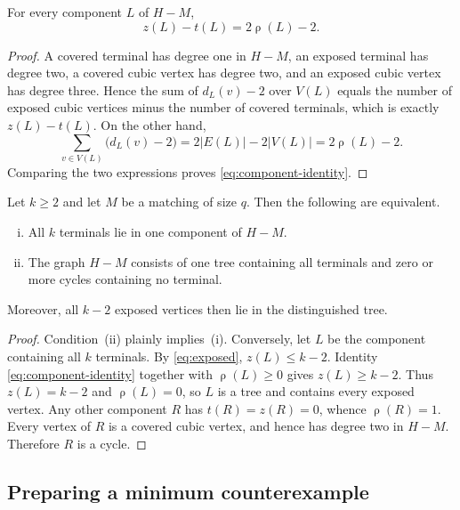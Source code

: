 \documentclass[a4paper,11pt]{article}
\newcommand{\abs}[1]{\left\lvert#1\right\rvert}
\DeclareMathOperator{\cyc}{\rho}               %
\numberwithin{equation}{section}
\begin{document}
\begin{lemma}\label{lem:component-identity}
  For every component $L$ of $H-M$,
  \begin{equation}\label{eq:component-identity}
    z(L)-t(L)=2\cyc(L)-2.
  \end{equation}
\end{lemma}

\begin{proof}
  A covered terminal has degree one in $H-M$, an exposed terminal has degree
  two, a covered cubic vertex has degree two, and an exposed cubic vertex has
  degree three. Hence the sum of $d_L(v)-2$ over $V(L)$ equals the number of
  exposed cubic vertices minus the number of covered terminals, which is
  exactly $z(L)-t(L)$. On the other hand,
  \[
    \sum_{v\in V(L)}\bigl(d_L(v)-2\bigr)=2\abs{E(L)}-2\abs{V(L)}=2\cyc(L)-2.
  \]
  Comparing the two expressions proves \cref{eq:component-identity}.
\end{proof}

\begin{lemma}\label{lem:terminal-criterion}
  Let $k\ge 2$ and let $M$ be a matching of size $q$. Then the following are
  equivalent.
  \begin{enumerate}[(i)]
    \item All $k$ terminals lie in one component of $H-M$.
    \item The graph $H-M$ consists of one tree containing all terminals and
      zero or more cycles containing no terminal.
  \end{enumerate}
  Moreover, all $k-2$ exposed vertices then lie in the distinguished tree.
\end{lemma}

\begin{proof}
  Condition~(ii) plainly implies~(i). Conversely, let $L$ be the component
  containing all $k$ terminals. By \cref{eq:exposed}, $z(L)\le k-2$. Identity
  \cref{eq:component-identity} together with $\cyc(L)\ge 0$ gives
  $z(L)\ge k-2$. Thus $z(L)=k-2$ and $\cyc(L)=0$, so $L$ is a tree and contains
  every exposed vertex. Any other component $R$ has $t(R)=z(R)=0$, whence
  $\cyc(R)=1$. Every vertex of $R$ is a covered cubic vertex, and hence has
  degree two in $H-M$. Therefore $R$ is a cycle.
\end{proof}

\subsection{Preparing a minimum counterexample}\label{sec:normalizations}
\end{document}
